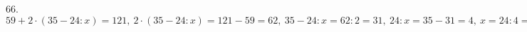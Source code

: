 66. $59+2\cdot(35-24:x)=121,\ 2\cdot(35-24:x)=121-59=62,\ 35-24:x=62:2=31,\ 24:x=35-31=4,\ x=24:4=6.$\\
